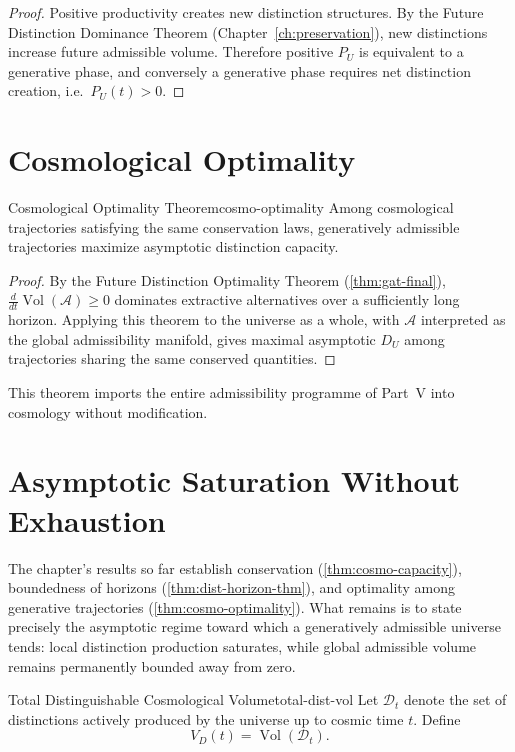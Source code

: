 \documentclass[12pt,twoside,openright]{book}
\newcommand{\Vol}{\operatorname{Vol}}
\begin{document}
\begin{proof}
  Positive productivity creates new distinction structures.
  By the Future Distinction Dominance Theorem
  (Chapter~\ref{ch:preservation}), new distinctions
  increase future admissible volume. Therefore positive
  $P_U$ is equivalent to a generative phase, and conversely
  a generative phase requires net distinction creation,
  i.e.\ $P_U(t) > 0$.
\end{proof}

\section{Cosmological Optimality}
\label{sec:ch19-optimality}

\begin{theorem}{Cosmological Optimality Theorem}{cosmo-optimality}
  Among cosmological trajectories satisfying the same
  conservation laws, generatively admissible trajectories
  maximize asymptotic distinction capacity.
\end{theorem}

\begin{proof}
  By the Future Distinction Optimality Theorem
  (\cref{thm:gat-final}), $\frac{d}{dt}\Vol(\mathcal{A}) \ge 0$
  dominates extractive alternatives over a sufficiently
  long horizon. Applying this theorem to the universe as a
  whole, with $\mathcal{A}$ interpreted as the global
  admissibility manifold, gives maximal asymptotic $D_U$
  among trajectories sharing the same conserved quantities.
\end{proof}

This theorem imports the entire admissibility programme of
Part~V into cosmology without modification.

\section{Asymptotic Saturation Without Exhaustion}
\label{sec:ch19-saturation}

The chapter's results so far establish conservation
(\cref{thm:cosmo-capacity}), boundedness of horizons
(\cref{thm:dist-horizon-thm}), and optimality among
generative trajectories (\cref{thm:cosmo-optimality}). What
remains is to state precisely the asymptotic regime toward
which a generatively admissible universe tends: local
distinction production saturates, while global admissible
volume remains permanently bounded away from zero.

\begin{definition}{Total Distinguishable Cosmological Volume}{total-dist-vol}
  Let $\mathcal{D}_t$ denote the set of distinctions
  actively produced by the universe up to cosmic time $t$.
  Define
  \[
    V_D(t) = \Vol(\mathcal{D}_t).
  \]
\end{definition}
\end{document}
